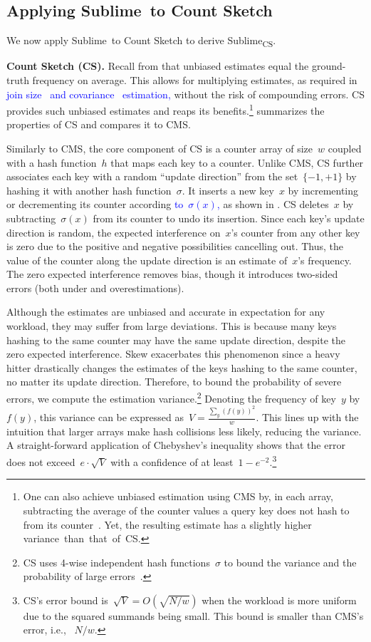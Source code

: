 \documentclass[sigconf]{acmart}
\newcommand{\sketch}{Sublime}
\newcommand{\sketchcs}{\sketch\textsubscript{CS}\xspace}
\begin{document}
\subsection{Applying \sketch\ to Count Sketch}\label{sec:cs}
We now apply \sketch\ to Count Sketch to derive \sketchcs.

\textbf{Count Sketch (CS).}
Recall from  that unbiased estimates equal the
ground-truth frequency on average. This allows for multiplying estimates, as
required in \textcolor{blue}{join
size~\cite{Compass,QueryOptimizationSketches,ConvolutionSketch} and
covariance~\cite{ASCS} estimation,} without the risk of compounding errors. CS
provides such unbiased estimates and reaps its benefits.\footnote{One can also
achieve unbiased estimation using CMS by, in each array, subtracting the
average of the counter values a query key does not hash to from its
counter~\cite{CountMeanMin}. Yet, the resulting estimate has a slightly higher
variance~than~that~of~CS.} 
summarizes the properties of
CS and compares it to CMS.

Similarly to CMS, the core component of CS is a counter array of size~$w$
coupled with a hash function~$h$ that maps each key to a counter. Unlike CMS,
CS further associates each key with a random ``update direction'' from the
set~$\{-1,+1\}$ by hashing it with another hash function~$\sigma$. It inserts a
new key~$x$ by incrementing or decrementing its counter according
\textcolor{blue}{to~$\sigma(x)$,} as shown in
.
CS deletes~$x$ by subtracting~$\sigma(x)$ from its counter to undo its
insertion. Since each key's update direction is random, the expected
interference on~$x$'s counter from any other key is zero due to the positive
and negative possibilities cancelling out. Thus, the value of the counter along
the update direction is an estimate of~$x$'s frequency. The zero expected
interference removes bias, though it introduces two-sided errors (both under
and overestimations). 

Although the estimates are unbiased and accurate in expectation for any
workload, they may suffer from large deviations. This is because many keys
hashing to the same counter may have the same update direction, despite the
zero expected interference. Skew exacerbates this phenomenon since a heavy
hitter drastically changes the estimates of the keys hashing to the same
counter, no matter its update direction. Therefore, to bound the probability of
severe errors, we compute the estimation variance.\footnote{CS uses 4-wise
independent hash functions~$\sigma$ to bound the variance and the probability
of large errors~\cite{CountSketch}.} Denoting the frequency of key~$y$ by
$f(y)$, this variance can be expressed as~$V=\frac{\sum_{y} (f(y))^2}{w}$. This
lines up with the intuition that larger arrays make hash collisions less
likely, reducing the variance. A straight-forward application of Chebyshev's
inequality shows that the error does not exceed~$e \cdot \sqrt{V}$ with a
confidence of at least~$1-e^{-2}$.\footnote{CS's error bound is~$\sqrt{V} =
O(\sqrt{N/w})$ when the workload is more uniform due to the squared summands
being small. This bound is smaller than CMS's error, i.e., ~$N/w$.}
\end{document}
